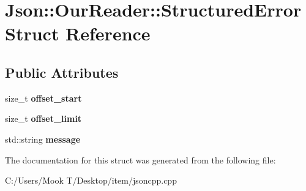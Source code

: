 \hypertarget{struct_json_1_1_our_reader_1_1_structured_error}{}\section{Json\+:\+:Our\+Reader\+:\+:Structured\+Error Struct Reference}
\label{struct_json_1_1_our_reader_1_1_structured_error}
\subsection*{Public Attributes}
\begin{DoxyCompactItemize}
\item 
\hypertarget{struct_json_1_1_our_reader_1_1_structured_error_a4eec161c2a6b4c89b6eb3d8d83834443}{}size\+\_\+t {\bfseries offset\+\_\+start}\label{struct_json_1_1_our_reader_1_1_structured_error_a4eec161c2a6b4c89b6eb3d8d83834443}

\item 
\hypertarget{struct_json_1_1_our_reader_1_1_structured_error_a6bab2650e5230fc15427b309de79fdbe}{}size\+\_\+t {\bfseries offset\+\_\+limit}\label{struct_json_1_1_our_reader_1_1_structured_error_a6bab2650e5230fc15427b309de79fdbe}

\item 
\hypertarget{struct_json_1_1_our_reader_1_1_structured_error_adc8a757b6452cc6ab14fb90b933b3414}{}std\+::string {\bfseries message}\label{struct_json_1_1_our_reader_1_1_structured_error_adc8a757b6452cc6ab14fb90b933b3414}

\end{DoxyCompactItemize}


The documentation for this struct was generated from the following file\+:\begin{DoxyCompactItemize}
\item 
C\+:/\+Users/\+Mook T/\+Desktop/item/jsoncpp.\+cpp\end{DoxyCompactItemize}
